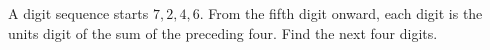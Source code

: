 A digit sequence starts $7,2,4,6$. From the fifth digit onward, each digit is the units digit of the sum of the preceding four. Find the next four digits.
